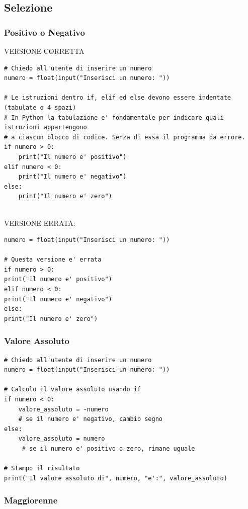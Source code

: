 \documentclass[a4paper,12pt]{article}
\begin{document}
	
	
	

\newpage
\subsection{Selezione}

\subsubsection{Positivo o Negativo}
VERSIONE CORRETTA
\begin{lstlisting}
# Chiedo all'utente di inserire un numero
numero = float(input("Inserisci un numero: "))

# Le istruzioni dentro if, elif ed else devono essere indentate (tabulate o 4 spazi)
# In Python la tabulazione e' fondamentale per indicare quali istruzioni appartengono
# a ciascun blocco di codice. Senza di essa il programma da errore.
if numero > 0:
	print("Il numero e' positivo")
elif numero < 0:
	print("Il numero e' negativo")
else:
	print("Il numero e' zero")
	
\end{lstlisting}

VERSIONE ERRATA:

\begin{lstlisting}
numero = float(input("Inserisci un numero: "))

# Questa versione e' errata
if numero > 0:
print("Il numero e' positivo")
elif numero < 0:
print("Il numero e' negativo")
else:
print("Il numero e' zero")
\end{lstlisting}

\newpage
\subsubsection{Valore Assoluto}

\begin{lstlisting}
# Chiedo all'utente di inserire un numero
numero = float(input("Inserisci un numero: "))

# Calcolo il valore assoluto usando if
if numero < 0:
	valore_assoluto = -numero  
	# se il numero e' negativo, cambio segno
else:
	valore_assoluto = numero  
	 # se il numero e' positivo o zero, rimane uguale

# Stampo il risultato
print("Il valore assoluto di", numero, "e':", valore_assoluto)
\end{lstlisting}


\newpage
\subsubsection{Maggiorenne}
\end{document}
